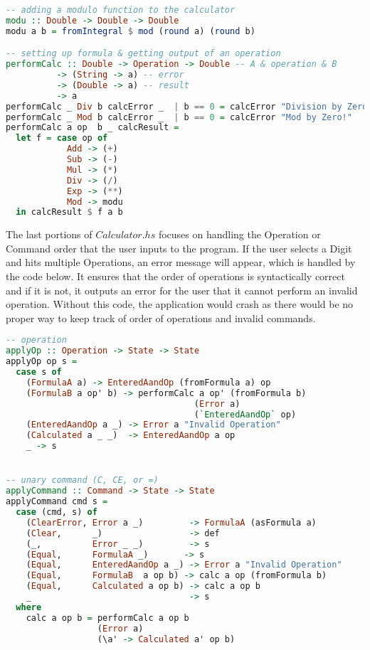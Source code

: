 \documentclass{article}
\begin{document}
\begin{lstlisting}[language=Haskell]
-- adding a modulo function to the calculator 
modu :: Double -> Double -> Double
modu a b = fromIntegral $ mod (round a) (round b)

-- setting up formula & getting output of an operation
performCalc :: Double -> Operation -> Double -- A & operation & B
          -> (String -> a) -- error 
          -> (Double -> a) -- result
          -> a 
performCalc _ Div b calcError _  | b == 0 = calcError "Division by Zero!"
performCalc _ Mod b calcError _  | b == 0 = calcError "Mod by Zero!"
performCalc a op  b _ calcResult =
  let f = case op of
            Add -> (+)
            Sub -> (-)
            Mul -> (*)
            Div -> (/)
            Exp -> (**)
            Mod -> modu
  in calcResult $ f a b
 \end{lstlisting}
 
\noindent
The last portions of $Calculator.hs$ focuses on handling the Operation or Command order that the user inputs to the program. If the user selects a Digit and hits multiple Operations, an error message will appear, which is handled by the code below. It ensures that the order of operations is syntactically correct and if it is not, it outputs an error for the user that it cannot perform an invalid operation. Without this code, the application would crash as there would be no proper way to keep track of order of operations and invalid commands. 

\begin{lstlisting}[language=Haskell]
-- operation 
applyOp :: Operation -> State -> State
applyOp op s =
  case s of
    (FormulaA a) -> EnteredAandOp (fromFormula a) op
    (FormulaB a op' b) -> performCalc a op' (fromFormula b)
                                     (Error a)
                                     (`EnteredAandOp` op)
    (EnteredAandOp a _) -> Error a "Invalid Operation"
    (Calculated a _ _)  -> EnteredAandOp a op
    _ -> s


-- unary command (C, CE, or =)
applyCommand :: Command -> State -> State
applyCommand cmd s =
  case (cmd, s) of
    (ClearError, Error a _)         -> FormulaA (asFormula a)
    (Clear,      _)                 -> def
    (_,          Error _ _)         -> s
    (Equal,      FormulaA _)       -> s
    (Equal,      EnteredAandOp a _) -> Error a "Invalid Operation"
    (Equal,      FormulaB  a op b) -> calc a op (fromFormula b)
    (Equal,      Calculated a op b) -> calc a op b
    _                               -> s
  where
    calc a op b = performCalc a op b
                  (Error a)
                  (\a' -> Calculated a' op b)
 \end{lstlisting}
 
\end{document}

